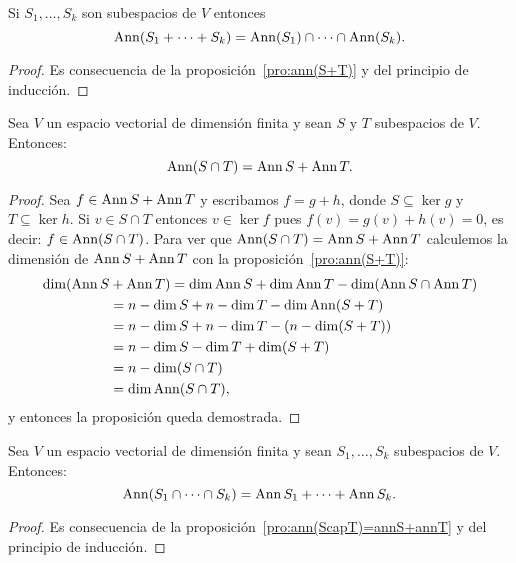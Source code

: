 \begin{cor}
    Si $S_1,\dots,S_k$ son subespacios de $V$ entonces 
	\begin{equation}
		\label{eq:ann(S1+...+S_k)}
		\operatorname{Ann} (S_1+\cdots+S_k)=\operatorname{Ann}(S_1)\cap\cdots\cap\operatorname{Ann}(S_k).
	\end{equation}

    \begin{proof}
        Es consecuencia de la proposición~\ref{pro:ann(S+T)} y del principio de
        inducción.
    \end{proof}
\end{cor}

\begin{prop}
	\label{pro:ann(ScapT)=annS+annT}
	Sea $V$ un espacio vectorial de dimensión finita y sean $S$ y $T$ subespacios
	de $V$.  Entonces:
	\[
	\operatorname{Ann} (S\cap T)=\operatorname{Ann} S+\operatorname{Ann} T.
	\]

	\begin{proof}
		Sea $f\in\operatorname{Ann} S +\operatorname{Ann} T$ y escribamos $f=g+h$, donde $S\subseteq\ker g$
		y $T\subseteq\ker h$. Si $v\in S\cap T$ entonces $v\in\ker f$ pues
		$f(v)=g(v)+h(v)=0$, es decir: $f\in\operatorname{Ann}(S\cap T)$. Para ver que $\operatorname{Ann}
		(S\cap T)=\operatorname{Ann} S+\operatorname{Ann} T$ calculemos la dimensión de $\operatorname{Ann} S+\operatorname{Ann} T$ con
		la proposición~\ref{pro:ann(S+T)}:
		\begin{align*}
			\dim(\operatorname{Ann} S&+\operatorname{Ann} T) = \dim\operatorname{Ann} S+\dim\operatorname{Ann} T-\dim(\operatorname{Ann} S\cap\operatorname{Ann} T)\\
			&=n-\dim S+n-\dim T-\dim\operatorname{Ann}(S+T)\\
			&=n-\dim S+n-\dim T-(n-\dim(S+T))\\
			&=n-\dim S-\dim T+\dim(S+T)\\
			&=n-\dim(S\cap T)\\
			&=\dim\operatorname{Ann}(S\cap T),
		\end{align*}
		y entonces la proposición queda demostrada.
	\end{proof}
\end{prop}

\begin{cor}
	Sea $V$ un espacio vectorial de dimensión finita y sean $S_1,\dots,S_k$
	subespacios de $V$.  Entonces:
	\[
	\operatorname{Ann} (S_1\cap\cdots\cap S_k)=\operatorname{Ann} S_1+\cdots+\operatorname{Ann} S_k.
	\]

    \begin{proof}
        Es consecuencia de la proposición~\ref{pro:ann(ScapT)=annS+annT} y del
        principio de inducción.
    \end{proof}
\end{cor}

